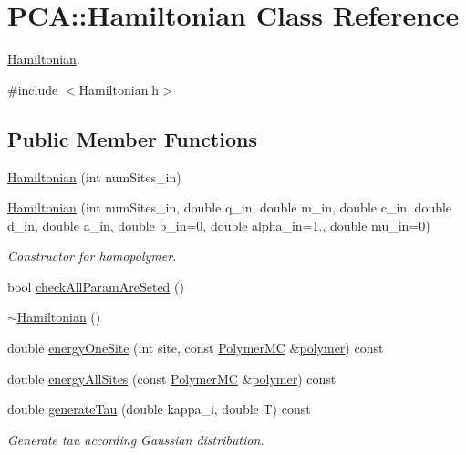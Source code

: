 \hypertarget{class_p_c_a_1_1_hamiltonian}{}\section{P\+CA\+:\+:Hamiltonian Class Reference}
\label{class_p_c_a_1_1_hamiltonian}


\hyperlink{class_p_c_a_1_1_hamiltonian}{Hamiltonian}.  




{\ttfamily \#include $<$Hamiltonian.\+h$>$}

\subsection*{Public Member Functions}
\begin{DoxyCompactItemize}
\item 
\hyperlink{class_p_c_a_1_1_hamiltonian_a3010d0e945bf871c22e57d530783c02a}{Hamiltonian} (int num\+Sites\+\_\+in)
\item 
\hyperlink{class_p_c_a_1_1_hamiltonian_ad2663a98cb52b4675ed01d6b911dd45a}{Hamiltonian} (int num\+Sites\+\_\+in, double q\+\_\+in, double m\+\_\+in, double c\+\_\+in, double d\+\_\+in, double a\+\_\+in, double b\+\_\+in=0, double alpha\+\_\+in=1., double mu\+\_\+in=0)
\begin{DoxyCompactList}\small\item\em Constructor for homopolymer. \end{DoxyCompactList}\item 
bool \hyperlink{class_p_c_a_1_1_hamiltonian_a3c9bddc6635c2a5a2ba0b2956126eb79}{check\+All\+Param\+Are\+Seted} ()
\item 
\hyperlink{class_p_c_a_1_1_hamiltonian_a87dcca06e1580312d8ffd4ef7fcad219}{$\sim$\+Hamiltonian} ()
\item 
double \hyperlink{class_p_c_a_1_1_hamiltonian_aaf2a99fc482ccd2ebb0dc671f1a8df5a}{energy\+One\+Site} (int site, const \hyperlink{class_p_c_a_1_1_polymer_m_c}{Polymer\+MC} \&\hyperlink{classpolymer}{polymer}) const
\item 
double \hyperlink{class_p_c_a_1_1_hamiltonian_a0751ca31444a5de38e6e5d7d07843538}{energy\+All\+Sites} (const \hyperlink{class_p_c_a_1_1_polymer_m_c}{Polymer\+MC} \&\hyperlink{classpolymer}{polymer}) const
\item 
double \hyperlink{class_p_c_a_1_1_hamiltonian_ad940f8b79c95c45ba11fe21f9491240b}{generate\+Tau} (double kappa\+\_\+i, double T) const
\begin{DoxyCompactList}\small\item\em Generate tau according Gaussian distribution. \end{DoxyCompactList}\end{DoxyCompactItemize}
